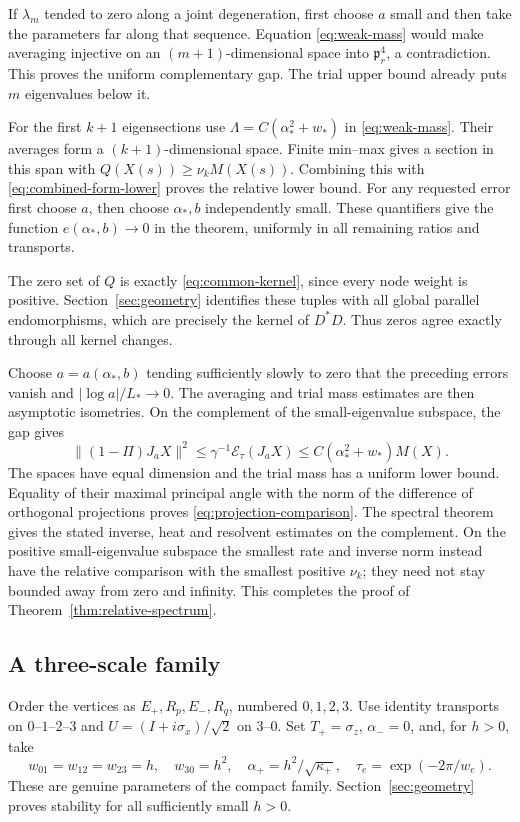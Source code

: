 If $\lambda_m$ tended to zero along a joint degeneration,
first choose $a$ small and then take the parameters far
along that sequence. Equation \eqref{eq:weak-mass} would
make averaging injective on an $(m+1)$-dimensional space
into $\mathfrak p_r^4$, a contradiction. This proves
the uniform complementary gap. The trial upper bound
already puts $m$ eigenvalues below it.

For the first $k+1$ eigensections use
$\Lambda=C(\alpha_*^2+w_*)$ in \eqref{eq:weak-mass}.
Their averages form a $(k+1)$-dimensional space.
Finite min--max gives a section in this span with
$Q(X(s))\ge\nu_kM(X(s))$. Combining this with
\eqref{eq:combined-form-lower} proves the relative lower
bound. For any requested error first choose $a$, then
choose $\alpha_*,b$ independently small. These quantifiers
give the function $e(\alpha_*,b)\to0$ in the theorem,
uniformly in all remaining ratios and transports.

The zero set of $Q$ is exactly
\eqref{eq:common-kernel}, since every node weight is
positive. Section~\ref{sec:geometry} identifies these
tuples with all global parallel endomorphisms, which are
precisely the kernel of $D^*D$. Thus zeros agree exactly
through all kernel changes.

Choose $a=a(\alpha_*,b)$ tending sufficiently slowly to
zero that the preceding errors vanish and
$|\log a|/L_*\to0$. The averaging and trial mass
estimates are then asymptotic isometries. On the
complement of the small-eigenvalue subspace, the gap gives
\[
 \|(1-\Pi)J_aX\|^2\le
       \gamma^{-1}\mathcal E_\tau(J_aX)
       \le C(\alpha_*^2+w_*)M(X).
\]
The spaces have equal dimension and the trial mass
has a uniform lower bound. Equality of their maximal
principal angle with the norm of the difference of
orthogonal projections proves
\eqref{eq:projection-comparison}. The spectral theorem
gives the stated inverse, heat and resolvent estimates
on the complement. On the positive small-eigenvalue subspace the
smallest rate and inverse norm instead have the
relative comparison with the smallest positive
$\nu_k$; they need not stay bounded away from zero
and infinity. This completes the proof of
Theorem~\ref{thm:relative-spectrum}.

\subsection{A three-scale family}
Order the vertices as $E_+,R_p,E_-,R_q$, numbered $0,1,2,3$.
Use identity transports on $0$--$1$--$2$--$3$ and
$U=(I+i\sigma_x)/\sqrt2$ on $3$--$0$. Set $T_+=\sigma_z$,
$\alpha_-=0$, and, for $h>0$, take
\begin{equation}\label{eq:h-family}
 w_{01}=w_{12}=w_{23}=h,\quad w_{30}=h^2,\quad
 \alpha_+=h^2/\sqrt{\kappa_+},\quad
 \tau_e=\exp(-2\pi/w_e).
\end{equation}
These are genuine parameters of the compact family.
Section~\ref{sec:geometry} proves stability for all
sufficiently small $h>0$.

